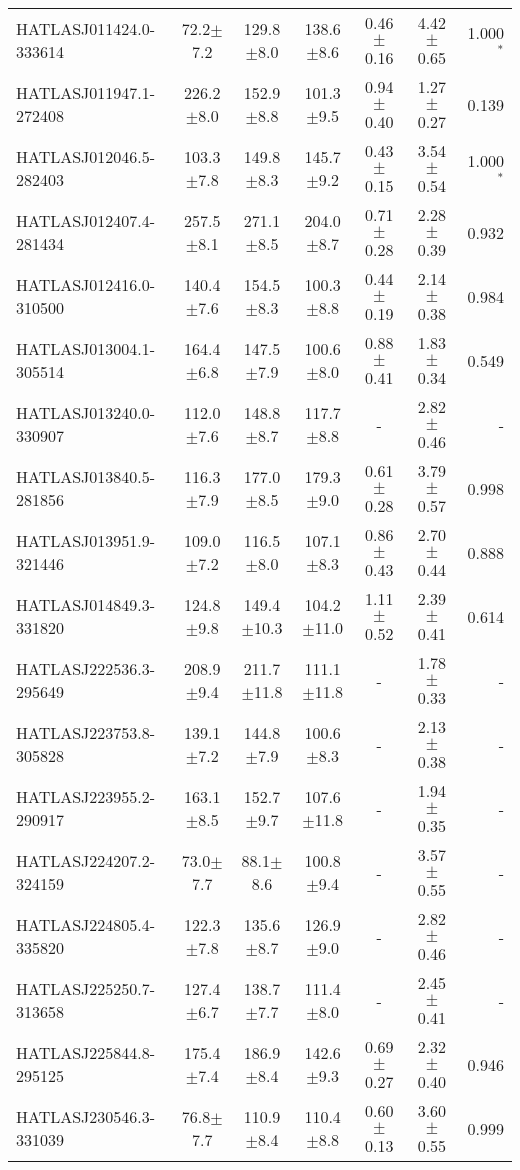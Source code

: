 \begin{landscape}
\begin{longtable}[h!]{lcccccr}
    HATLASJ011424.0-333614 & 72.2$\pm$7.2 & 129.8$\pm$8.0 & 138.6$\pm$8.6 & 0.46$\pm$0.16 & 4.42$\pm$0.65 & 1.000$^{\ast}$ \\
    HATLASJ011947.1-272408 & 226.2$\pm$8.0 & 152.9$\pm$8.8 & 101.3$\pm$9.5 & 0.94$\pm$0.40 & 1.27$\pm$0.27 & 0.139 \\
    HATLASJ012046.5-282403 & 103.3$\pm$7.8 & 149.8$\pm$8.3 & 145.7$\pm$9.2 & 0.43$\pm$0.15 & 3.54$\pm$0.54 & 1.000$^{\ast}$ \\
    HATLASJ012407.4-281434 & 257.5$\pm$8.1 & 271.1$\pm$8.5 & 204.0$\pm$8.7 & 0.71$\pm$0.28 & 2.28$\pm$0.39 & 0.932 \\
    HATLASJ012416.0-310500 & 140.4$\pm$7.6 & 154.5$\pm$8.3 & 100.3$\pm$8.8 & 0.44$\pm$0.19 & 2.14$\pm$0.38 & 0.984 \\
    HATLASJ013004.1-305514 & 164.4$\pm$6.8 & 147.5$\pm$7.9 & 100.6$\pm$8.0 & 0.88$\pm$0.41 & 1.83$\pm$0.34 & 0.549 \\
    HATLASJ013240.0-330907 & 112.0$\pm$7.6 & 148.8$\pm$8.7 & 117.7$\pm$8.8 & - & 2.82$\pm$0.46 & - \\
    HATLASJ013840.5-281856 & 116.3$\pm$7.9 & 177.0$\pm$8.5 & 179.3$\pm$9.0 & 0.61$\pm$0.28 & 3.79$\pm$0.57 & 0.998 \\
    HATLASJ013951.9-321446 & 109.0$\pm$7.2 & 116.5$\pm$8.0 & 107.1$\pm$8.3 & 0.86$\pm$0.43 & 2.70$\pm$0.44 & 0.888 \\
    HATLASJ014849.3-331820 & 124.8$\pm$9.8 & 149.4$\pm$10.3 & 104.2$\pm$11.0 & 1.11$\pm$0.52 & 2.39$\pm$0.41 & 0.614 \\
    HATLASJ222536.3-295649 & 208.9$\pm$9.4 & 211.7$\pm$11.8 & 111.1$\pm$11.8 & - & 1.78$\pm$0.33 & - \\
    HATLASJ223753.8-305828 & 139.1$\pm$7.2 & 144.8$\pm$7.9 & 100.6$\pm$8.3 & - & 2.13$\pm$0.38 & - \\
    HATLASJ223955.2-290917 & 163.1$\pm$8.5 & 152.7$\pm$9.7 & 107.6$\pm$11.8 & - & 1.94$\pm$0.35 & - \\
    HATLASJ224207.2-324159 & 73.0$\pm$7.7 & 88.1$\pm$8.6 & 100.8$\pm$9.4 & - & 3.57$\pm$0.55 & - \\
    HATLASJ224805.4-335820 & 122.3$\pm$7.8 & 135.6$\pm$8.7 & 126.9$\pm$9.0 & - & 2.82$\pm$0.46 & - \\
    HATLASJ225250.7-313658 & 127.4$\pm$6.7 & 138.7$\pm$7.7 & 111.4$\pm$8.0 & - & 2.45$\pm$0.41 & - \\
    HATLASJ225844.8-295125 & 175.4$\pm$7.4 & 186.9$\pm$8.4 & 142.6$\pm$9.3 & 0.69$\pm$0.27 & 2.32$\pm$0.40 & 0.946 \\
    HATLASJ230546.3-331039 & 76.8$\pm$7.7 & 110.9$\pm$8.4 & 110.4$\pm$8.8 & 0.60$\pm$0.13 & 3.60$\pm$0.55 & 0.999 \\

\end{longtable}
\end{landscape}
